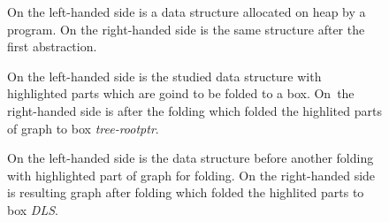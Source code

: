 { %
\begin{figure}
\label{ref:fig-re1}
\begin{center}
  \begin{subfigure}[b]{0.45\linewidth}
  \end{subfigure}
  \begin{subfigure}[b]{0.45\linewidth}
  \end{subfigure}
\end{center}
\caption{On the left-handed side is a data structure allocated on heap by a program. On the right-handed side is the same structure after the first abstraction.}
\end{figure}

\begin{figure}
\label{ref:fig-re2}
\begin{center}
  \begin{subfigure}[b]{0.47\linewidth}
  \end{subfigure}
  \begin{subfigure}[b]{0.47\linewidth}
  \end{subfigure}
\end{center}
\caption{On the left-handed side is the studied data structure with highlighted parts which are goind to be folded to a box. On~the right-handed side is after the folding
which folded the highlited parts of graph to box \emph{tree-rootptr}.}
\end{figure}

\begin{figure}
\label{ref:fig-re3}
\begin{center}
  \begin{subfigure}[b]{0.49\linewidth}
  \end{subfigure}
  \begin{subfigure}[b]{0.49\linewidth}
  \end{subfigure}
\end{center}
\caption{On the left-handed side is the data structure before another folding with highlighted part of graph for folding.
On the right-handed side is resulting graph after folding which folded the highlited parts to box \emph{DLS}.}
\end{figure}

}
